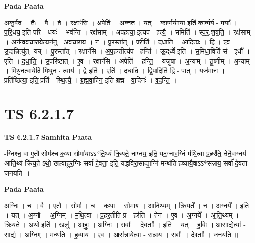 \documentclass[17pt]{extarticle}
\begin{document}
\textbf{Pada Paata} \newline

अ॒कु॒र्व॒त॒ । तैः । वै । ते । रक्षाꣳ॑सि । अपेति॑ । अ॒घ्न॒त॒ । यत् । का॒र्ष्म॒र्य॒मया॒ इति॑ कार्ष्मर्य - मयाः᳚ । प॒रि॒धय॒ इति॑ परि - धयः॑ । भव॑न्ति । रक्ष॑साम् । अप॑हत्या॒ इत्यप॑ - ह॒त्यै॒ । समिति॑ । स्प॒र्॒.श॒य॒ति॒ । रक्ष॑साम् । अन॑न्ववचारा॒येत्यन॑नु - अ॒व॒चा॒रा॒य॒ । न । पु॒रस्ता᳚त् । परीति॑ । द॒धा॒ति॒ । आ॒दि॒त्यः । हि । ए॒व । उ॒द्यन्नित्यु॑त्- यन्न् । पु॒रस्ता᳚त् । रक्षाꣳ॑सि । अ॒प॒हन्तीत्य॑प - हन्ति॑ । ऊ॒द्‌र्ध्वे इति॑ । स॒मिधा॒विति॑ सं - इधौ᳚ । एति॑ । द॒धा॒ति॒ । उ॒परि॑ष्टात् । ए॒व । रक्षाꣳ॑सि । अपेति॑ । ह॒न्ति॒ । यजु॑षा । अ॒न्याम् । तू॒ष्णीम् । अ॒न्याम् । मि॒थु॒न॒त्वायेति॑ मिथुन - त्वाय॑ । द्वे इति॑ । एति॑ । द॒धा॒ति॒ । द्वि॒पादिति॑ द्वि - पात् । यज॑मानः । प्रति॑ष्ठित्या॒ इति॒ प्रति॑ - स्थि॒त्यै॒ । ब्र॒ह्म॒वा॒दिन॒ इति॑ ब्रह्म - वा॒दिनः॑ । व॒द॒न्ति॒ ।  \newline





\section{ TS 6.2.1.7 }

\textbf{TS 6.2.1.7 } \newline
\textbf{Samhita Paata} \newline

-ग्निश्च॒ वा ए॒तौ सोम॑श्च क॒था सोमा॑याऽऽ*ति॒थ्यं क्रि॒यते॒ नाग्नय॒ इति॒ यद॒ग्नाव॒ग्निं म॑थि॒त्वा प्र॒हर॑ति॒ तेनै॒वाग्नय॑ आति॒थ्यं क्रि॑य॒ते ऽथो॒ खल्वा॑हुर॒ग्निः सर्वा॑ दे॒वता॒ इति॒ यद्ध॒विरा॒साद्या॒ग्निं मन्थ॑ति ह॒व्यायै॒वाऽऽ*स॑न्नाय॒ सर्वा॑ दे॒वता॑ जनयति ॥ \newline

\textbf{Pada Paata} \newline

अ॒ग्निः । च॒ । वै । ए॒तौ । सोमः॑ । च॒ । क॒था । सोमा॑य । आ॒ति॒थ्यम् । क्रि॒यते᳚ । न । अ॒ग्नये᳚ । इति॑ । यत् । अ॒ग्नौ । अ॒ग्निम् । म॒थि॒त्वा । प्र॒हर॒तीति॑ प्र - हर॑ति । तेन॑ । ए॒व । अ॒ग्नये᳚ । आ॒ति॒थ्यम् । क्रि॒य॒ते॒ । अथो॒ इति॑ । खलु॑ । आ॒हुः॒ । अ॒ग्निः । सर्वाः᳚ । दे॒वताः᳚ । इति॑ । यत् । ह॒विः । आ॒साद्येत्या᳚ - साद्य॑ । अ॒ग्निम् । मन्थ॑ति । ह॒व्याय॑ । ए॒व । आस॑न्ना॒येत्या - स॒न्ना॒य॒ । सर्वाः᳚ । दे॒वताः᳚ । ज॒न॒य॒ति॒ ॥  \newline




\end{document}
